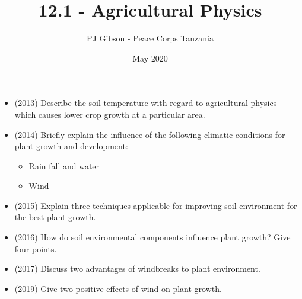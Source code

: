 \documentclass{article}
\title{\textbf{12.1 - Agricultural Physics}}
\author{PJ Gibson - Peace Corps Tanzania}
\date{May 2020}
\begin{document}
\maketitle

\begin{itemize}
\item (2013)  Describe the soil temperature with regard to agricultural physics which causes lower crop growth at a particular area.
\item (2014)  Briefly explain the influence of the following climatic conditions for plant growth and development:
 \begin{itemize}
\item Rain fall and water
\item Wind
\end{itemize}
\item (2015)  Explain three techniques applicable for improving soil environment for the best plant growth.
\item (2016)  How do soil environmental components influence plant growth? Give four points.
\item (2017)  Discuss two advantages of windbreaks to plant environment. 
\item (2019)  Give two positive effects of wind on plant growth.
\end{itemize}
\end{document}
